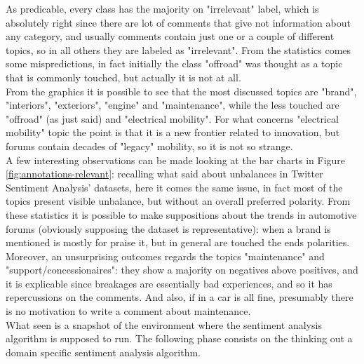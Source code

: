 As predicable, every class has the majority on "irrelevant" label, which is absolutely right since there are lot of comments that give not information about any category, and usually comments contain just one or a couple of different topics, so in all others they are labeled as "irrelevant". From the statistics comes some mispredictions, in fact initially the class "offroad" was thought as a topic that is commonly touched, but actually it is not at all. \\
From the graphics it is possible to see that the most discussed topics are "brand", "interiors", "exteriors", "engine" and "maintenance", while the less touched are "offroad" (as just said) and "electrical mobility". For what concerns "electrical mobility" topic the point is that it is a new frontier related to innovation, but forums contain decades of "legacy" mobility, so it is not so strange.\\
A few interesting observations can be made looking at the bar charts in Figure \ref{fig:annotations-relevant}: recalling what said about unbalances in Twitter Sentiment Analysis' datasets, here it comes the same issue, in fact most of the topics present visible unbalance, but without an overall preferred polarity. From these statistics it is possible to make suppositions about the trends in automotive forums (obviously supposing the dataset is representative): when a brand is mentioned is mostly for praise it, but in general are touched the ends polarities. Moreover, an unsurprising outcomes regards the topics "maintenance" and "support/concessionaires": they show a majority on negatives above positives, and it is explicable since breakages are essentially bad experiences, and so it has repercussions on the comments. And also, if in a car is all fine, presumably there is no motivation to write a comment about maintenance.\\

What seen is a snapshot of the environment where the sentiment analysis algorithm is supposed to run. The following phase consists on the thinking out a domain specific sentiment analysis algorithm.




























